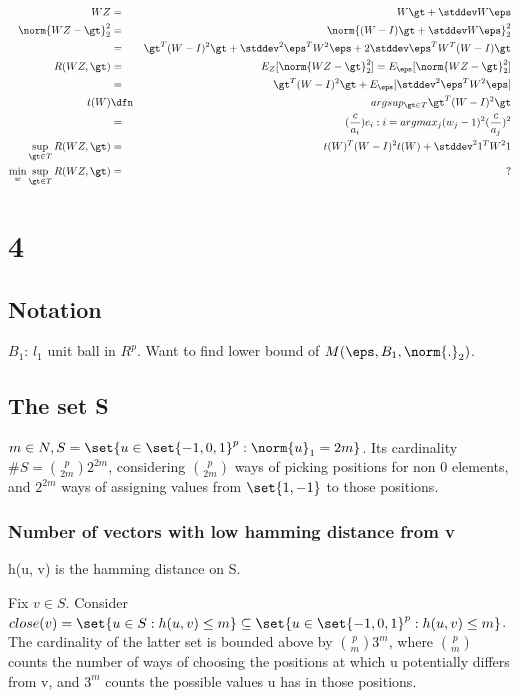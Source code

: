 \documentclass{article}
\begin{document}
\begin{eqnarray*}
WZ &=& W\gt + \stddev W\eps\\ 
\norm{WZ - \gt}_2^{2} &=& \norm{(W - I)\gt + \stddev W\eps}_2^{2}\\
&=& \gt^{T}(W - I)^{2}\gt + \stddev^{2} \eps^{T}W^{2}\eps + 2 \stddev \eps^{T}W^{T}(W - I)\gt\\
R(WZ, \gt) &=& E_Z[\norm{WZ - \gt}_2^{2}] = E_\eps[\norm{WZ - \gt}_2^{2}]\\
&=& \gt^{T}(W - I)^{2}\gt + E_\eps[\stddev^{2} \eps^{T}W^{2}\eps]\\
t(W) &\dfn& argsup_{\gt \in T} \gt^{T}(W - I)^{2}\gt\\
&=& (\frac{c}{a_i})e_i: i = argmax_j (w_j-1)^{2}(\frac{c}{a_j})^{2}\\
\sup_{\gt \in T} R(WZ, \gt) &=& t(W)^{T}(W - I)^{2}t(W) + \stddev^{2} 1^{T}W^{2}1\\
\min_w \sup_{\gt \in T} R(WZ, \gt) &=& ?\\
\end{eqnarray*}
\tbc


\section{4}
\subsection{Notation}
$B_1$: $l_1$ unit ball in $R^{p}$. Want to find lower bound of $M(\eps, B_1, \norm{.}_2)$.

\subsection{The set S}
$m \in N, S = \set{u \in \set{-1, 0, 1}^{p} : \norm{u}_1 = 2m}$. Its cardinality $\#S = \binom{p}{2m} 2^{2m}$, considering $\binom{p}{2m}$ ways of picking positions for non 0 elements, and $2^{2m}$ ways of assigning values from $\set{1, -1}$ to those positions.

\subsubsection{Number of vectors with low hamming distance from v}
h(u, v) is the hamming distance on S.

Fix $v \in S$. Consider \\
$close(v) = \set{u \in S: h(u, v) \leq m} \subseteq \set{u \in \set{-1, 0, 1}^{p}: h(u, v) \leq m}$. The cardinality of the latter set is bounded above by $\binom{p}{m} 3^{m}$, where $\binom{p}{m}$ counts the number of ways of choosing the positions at which u potentially differs from v, and $3^{m}$ counts the possible values u has in those positions.
\end{document}
